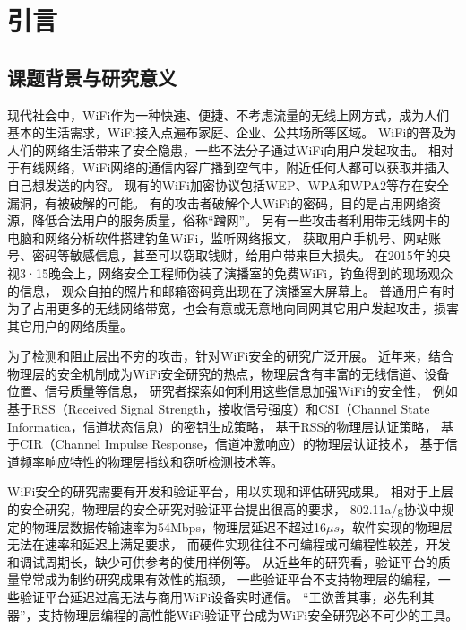 
\chapter{引言}
	\section{课题背景与研究意义}

		现代社会中，WiFi作为一种快速、便捷、不考虑流量的无线上网方式，成为人们基本的生活需求，WiFi接入点遍布家庭、企业、公共场所等区域。
		WiFi的普及为人们的网络生活带来了安全隐患，一些不法分子通过WiFi向用户发起攻击。
		相对于有线网络，WiFi网络的通信内容广播到空气中，附近任何人都可以获取并插入自己想发送的内容。
		现有的WiFi加密协议包括WEP、WPA和WPA2等存在安全漏洞，有被破解的可能\cite{wisec09wep}。
		有的攻击者破解个人WiFi的密码，目的是占用网络资源，降低合法用户的服务质量，俗称“蹭网”。
		另有一些攻击者利用带无线网卡的电脑和网络分析软件搭建钓鱼WiFi，监听网络报文，
		获取用户手机号、网站账号、密码等敏感信息，甚至可以窃取钱财，给用户带来巨大损失。
		在2015年的央视3·15晚会上，网络安全工程师伪装了演播室的免费WiFi，钓鱼得到的现场观众的信息，
		观众自拍的照片和邮箱密码竟出现在了演播室大屏幕上\cite{cctv315}。
		普通用户有时为了占用更多的无线网络带宽，也会有意或无意地向同网其它用户发起攻击，损害其它用户的网络质量\cite{tifs12reciprocity}。

		为了检测和阻止层出不穷的攻击，针对WiFi安全的研究广泛开展。
		近年来，结合物理层的安全机制成为WiFi安全研究的热点，物理层含有丰富的无线信道、设备位置、信号质量等信息，
		研究者探索如何利用这些信息加强WiFi的安全性，
		例如基于RSS（Received Signal Strength，接收信号强度）和CSI（Channel State Informatica，信道状态信息）的密钥生成策略\cite{access16key}，
		基于RSS的物理层认证策略\cite{ieeewc10noncryp}，
		基于CIR（Channel Impulse Response，信道冲激响应）的物理层认证技术\cite{milcom11cir, icc13cir}，
		基于信道频率响应特性的物理层指纹和窃听检测技术\cite{icc07xiao, globecom10xiao}等。

		WiFi安全的研究需要有开发和验证平台，用以实现和评估研究成果。
		相对于上层的安全研究，物理层的安全研究对验证平台提出很高的要求，
		802.11a/g协议中规定的物理层数据传输速率为54Mbps，物理层延迟不超过16$\mu s$，软件实现的物理层无法在速率和延迟上满足要求，
		而硬件实现往往不可编程或可编程性较差，开发和调试周期长，缺少可供参考的使用样例等。
		从近些年的研究看，验证平台的质量常常成为制约研究成果有效性的瓶颈，
		一些验证平台不支持物理层的编程，一些验证平台延迟过高无法与商用WiFi设备实时通信\cite{mobicom13securearray}。
		“工欲善其事，必先利其器”，支持物理层编程的高性能WiFi验证平台成为WiFi安全研究必不可少的工具。


